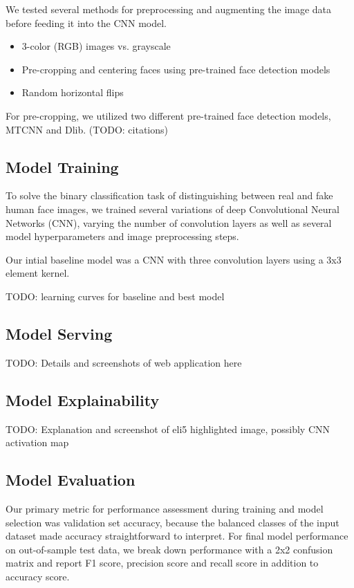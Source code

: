 \documentclass[11pt, letterpaper]{article}
\providecommand{\tightlist}{%
  \setlength{\itemsep}{0pt}\setlength{\parskip}{0pt}
}
\begin{document}
\begin{multicols}{2}
  We tested several methods for preprocessing and augmenting the image data
  before feeding it into the CNN model.

  \begin{itemize}
    \tightlist
  \item 3-color (RGB) images vs. grayscale
  \item Pre-cropping and centering faces using pre-trained face detection models
  \item Random horizontal flips
  \end{itemize}

  For pre-cropping, we utilized two different pre-trained face detection models,
  MTCNN and Dlib. (TODO: citations)

  \subsection{Model Training}

  To solve the binary classification task of distinguishing between real and
  fake human face images, we trained several variations of deep Convolutional
  Neural Networks (CNN), varying the number of convolution layers as well as
  several model hyperparameters and image preprocessing steps.

  Our intial baseline model was a CNN with three convolution layers using a 3x3
  element kernel.

  TODO: learning curves for baseline and best model

  \subsection{Model Serving}

  TODO: Details and screenshots of web application here

  \subsection{Model Explainability}

  TODO: Explanation and screenshot of eli5 highlighted image, possibly CNN
  activation map

  \subsection{Model Evaluation}

  Our primary metric for performance assessment during training and model
  selection was validation set accuracy, because the balanced classes of the
  input dataset made accuracy straightforward to interpret. For final model
  performance on out-of-sample test data, we break down performance with a 2x2
  confusion matrix and report F1 score, precision score and recall score in
  addition to accuracy score.


\end{multicols}
\end{document}
